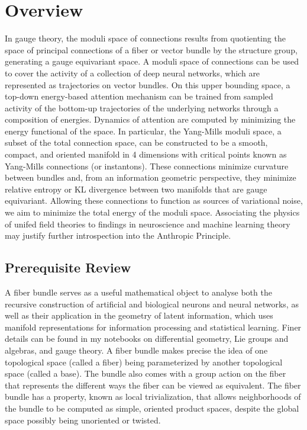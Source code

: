 \documentclass{article}
\begin{document}
\section{Overview}
In gauge theory, the moduli space of connections results from quotienting the space of principal connections of a fiber or vector bundle by the structure group, generating a gauge equivariant space. A moduli space of connections can be used to cover the activity of a collection of deep neural networks, which are represented as trajectories on vector bundles. On this upper bounding space, a top-down energy-based attention mechanism can be trained from sampled activity of the bottom-up trajectories of the underlying networks through a composition of energies. Dynamics of attention are computed by minimizing the energy functional of the space. In particular, the Yang-Mills moduli space, a subset of the total connection space, can be constructed to be a smooth, compact, and oriented manifold in 4 dimensions with critical points known as Yang-Mills connections (or instantons). These connections minimize curvature between bundles and, from an information geometric perspective, they minimize relative entropy or KL divergence between two manifolds that are gauge equivariant. Allowing these connections to function as sources of variational noise, we aim to minimize the total energy of the moduli space. Associating the physics of unifed field theories to findings in neuroscience and machine learning theory may justify further introspection into the Anthropic Principle.



\subsection{Prerequisite Review}
    A fiber bundle serves as a useful mathematical object to analyse both the recursive construction of artificial and biological neurons and neural networks, as well as their application in the geometry of latent information, which uses manifold representations for information processing and statistical learning.
    Finer details can be found in my notebooks on differential geometry, Lie groups and algebras, and gauge theory. A fiber bundle makes precise the idea of one topological space (called a fiber) being parameterized by another topological space (called a base). The bundle also comes with a group action on the fiber that represents the different ways the fiber can be viewed as equivalent. The fiber bundle has a property, known as local trivialization, that allows neighborhoods of the bundle to be computed as simple, oriented product spaces, despite the global space possibly being unoriented or twisted.
    
\end{document}
